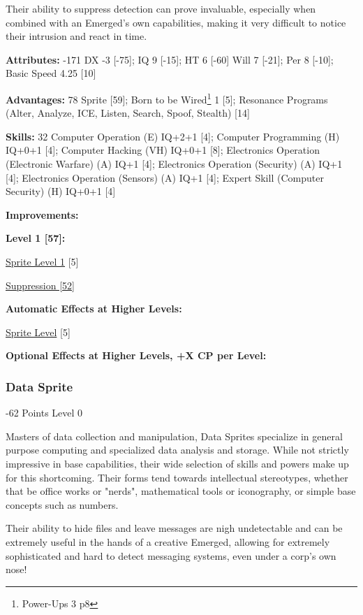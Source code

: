 \begin{multicols*}{3}
Their ability to suppress detection can prove invaluable, especially when combined with an Emerged's own capabilities, making it very difficult to notice their intrusion and react in time.

\textbf{Attributes:} -171
DX -3 [-75]; IQ 9 [-15]; HT 6 [-60]
Will 7 [-21]; Per 8 [-10]; Basic Speed 4.25 [10]

\textbf{Advantages:} 78
Sprite [59]; Born to be Wired\footnote{Power-Ups 3 p8} 1 [5]; Resonance Programs (Alter, Analyze, ICE, Listen, Search, Spoof, Stealth) [14]

\textbf{Skills:} 32
Computer Operation (E) IQ+2+1 [4]; Computer Programming (H) IQ+0+1 [4]; Computer Hacking (VH) IQ+0+1 [8]; Electronics Operation (Electronic Warfare) (A) IQ+1 [4]; Electronics Operation (Security) (A) IQ+1 [4]; Electronics Operation (Sensors) (A) IQ+1 [4]; Expert Skill (Computer Security) (H) IQ+0+1 [4]

\textbf{ Improvements:}

\textbf{Level 1 [57]:}

\hyperref[sprite_level]{Sprite Level 1} [5]

\hyperref[suppression]{Suppression [52]}

\textbf{Automatic Effects at Higher Levels:}

\hyperref[sprite_level]{Sprite Level} [5]

\textbf{Optional Effects at Higher Levels, +X CP per Level:}


\subsubsection{Data Sprite}
\begin{flushright}
	-62 Points Level 0
\end{flushright}

Masters of data collection and manipulation, Data Sprites specialize in general purpose computing and specialized data analysis and storage. While not strictly impressive in base capabilities, their wide selection of skills and powers make up for this shortcoming. Their forms tend towards intellectual stereotypes, whether that be office works or "nerds", mathematical tools or iconography, or simple base concepts such as numbers.

Their ability to hide files and leave messages are nigh undetectable and can be extremely useful in the hands of a creative Emerged, allowing for extremely sophisticated and hard to detect messaging systems, even under a corp's own nose!


\end{multicols*}
